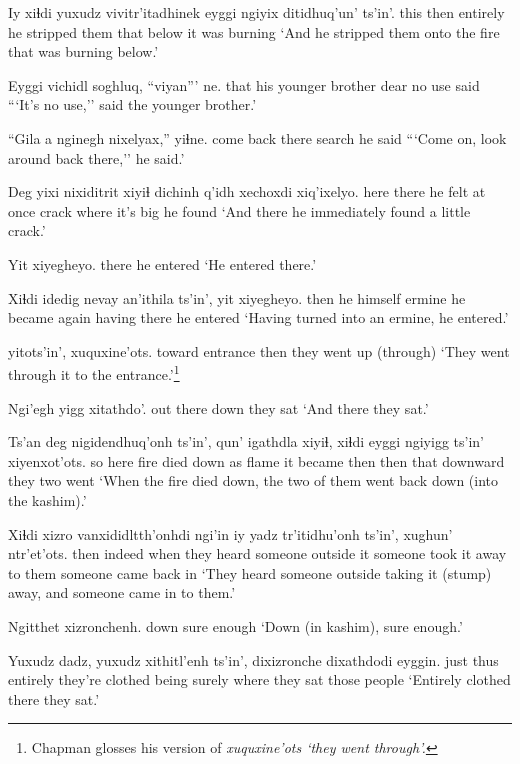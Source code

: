 \documentclass[12pt]{article}
\begin{document}
\gll Iy xiɬdi yuxudz vivitr'itadhinek eyggi  ngiyix ditidhuq'un' ts'in'.
this then entirely {he stripped them} that  below  {it was burning} {}
\glt `And he stripped them onto the fire that was burning below.'
\glend

\gll Eyggi vichidl  soghluq, ``viyan''' ne.
that  {his younger brother} dear {no use} said
\glt ```It's no use,'' said the younger brother.'
\glend

\gll ``Gila a nginegh nixelyax,'' yiɬne.
come {} {back there} search {he said}
\glt ```Come on, look around back there,'' he said.'
\glend

\gll Deg yixi nixiditrit  xiyiɬ {dichinh q'idh} xechoxdi xiq'ixelyo.
here there {he felt  } {at once} crack  {where it's big} {he found}
\glt `And there he immediately found a little crack.'
\glend

\gll Yit xiyegheyo.
there {he entered}
\glt `He entered there.'
\glend

\gll Xiɬdi idedig nevay  an'ithila ts'in',  yit xiyegheyo.
then {he himself} ermine  {he became again} having there {he entered}
\glt `Having turned into an ermine, he entered.'
\glend

  yitots'in', xuquxine'ots.
{toward entrance} then  {they went up (through)}
\glt `They went through it to the entrance.'\footnote{Chapman glosses his version of \em xuquxine'ots `they went through'.}
\glend

\gll Ngi'egh yigg xitathdo'.
{out there} down {they sat}
\glt `And there they sat.'
\glend

\gll Ts'an deg nigidendhuq'onh ts'in', qun' igathdla  xiyiɬ, xiɬdi eyggi  {ngiyigg ts'in'} xiyenxot'ots.
so here {fire died down} as flame {it became} then then that  downward  {they two went}
\glt `When the fire died down, the two of them went back down (into the kashim).'
\glend

\gll Xiɬdi xizro  vanxididltth'onhdi ngi'in  iy {yadz tr'itidhu'onh} ts'in', xughun' ntr'et'ots.
then indeed {when they heard someone} outside  it {someone took it away} {} {to them} {someone came back in}
\glt `They heard someone outside taking it (stump) away, and someone came in to them.'
\glend

\gll Ngitthet xizronchenh.
down  {sure enough}
\glt `Down (in kashim), sure enough.'
\glend

\gll Yuxudz dadz, yuxudz xithitl'enh ts'in', dixizronche dixathdodi eyggin. 
just  thus entirely {they're clothed} being surely  {where they sat} {those people}
\glt `Entirely clothed there they sat.'
\glend
\end{document}

